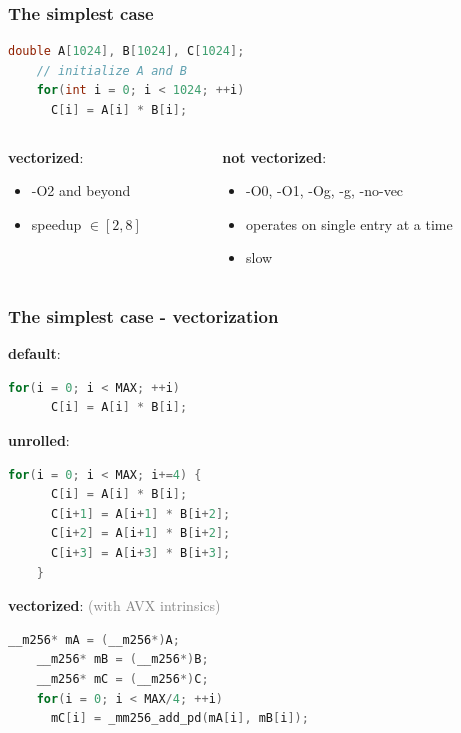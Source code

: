 \documentclass{beamer}
\begin{document}
\begin{frame}[fragile]
  \frametitle{The simplest case}
  
  \begin{lstlisting}[language=C++]
    double A[1024], B[1024], C[1024];
    // initialize A and B
    for(int i = 0; i < 1024; ++i) 
      C[i] = A[i] * B[i];   
  \end{lstlisting}
  
  \begin{columns}[onlytextwidth]
    \begin{column}{0.4\textwidth}
     \textbf{vectorized}:
     \begin{itemize}
      \item -O2 and beyond
      \item speedup $\in [2, 8]$
     \end{itemize}
    \end{column}
    
    \begin{column}{0.4\textwidth}
     \textbf{not vectorized}:
     \begin{itemize}
      \item -O0, -O1, -Og, -g, -no-vec
      \item operates on single entry at a time
      \item slow
     \end{itemize}
    \end{column}
  \end{columns}
  
\end{frame}


\begin{frame}[fragile]
  \frametitle{The simplest case - vectorization}
  
  \textbf{default}:
  \begin{lstlisting}[language=C++]
    for(i = 0; i < MAX; ++i) 
      C[i] = A[i] * B[i];   
  \end{lstlisting}
  
  \textbf{unrolled}:
  \begin{lstlisting}[language=C++]
    for(i = 0; i < MAX; i+=4) {
      C[i] = A[i] * B[i];
      C[i+1] = A[i+1] * B[i+2];
      C[i+2] = A[i+1] * B[i+2];
      C[i+3] = A[i+3] * B[i+3];
    }
  \end{lstlisting}
  
  \textbf{vectorized}: \textcolor{gray}{(with AVX intrinsics)}
  \begin{lstlisting}[language=C++]
    __m256* mA = (__m256*)A;
    __m256* mB = (__m256*)B;
    __m256* mC = (__m256*)C;
    for(i = 0; i < MAX/4; ++i) 
      mC[i] = _mm256_add_pd(mA[i], mB[i]);
  \end{lstlisting}
  
\end{frame}
\end{document}
